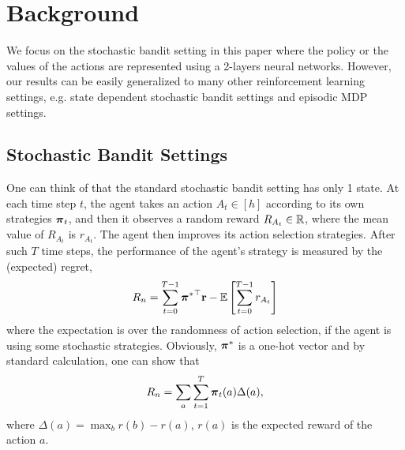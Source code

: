 \section{Background}
\label{sec:background}

We focus on the stochastic bandit setting in this paper where the policy or the values of the actions are represented using a 2-layers neural networks.  
However, our results can be easily generalized to many other reinforcement learning settings, e.g. state dependent stochastic bandit settings and episodic MDP settings.

\subsection{Stochastic Bandit Settings}
\label{subsec:settings}

One can think of that the standard stochastic bandit setting has only 1 state.  
At each time step $t$, the agent takes an action $A_t \in [h]$ according to its own strategies ${\boldsymbol{\pi}}_t$, and then it observes a random reward $R_{A_t} \in {\mathbb{R}}$, where the mean value of $R_{A_t}$ is $r_{A_t}$. 
The agent then improves its action selection strategies. 
After such $T$ time steps, the performance of the agent's strategy is measured by the (expected) regret,
\begin{equation}
\label{eq:expected_regret}
R_n = \sum\limits_{t=0}^{T-1}{{{\boldsymbol{\pi}}^*}^\top {\mathbf{r}}} - {\mathbb{E}} \left[ \sum\limits_{t=0}^{T-1}{  r_{ A_t}  } \right] 
\end{equation}
where the expectation is over the randomness of action selection, if the agent is using some stochastic strategies.
Obviously, ${\boldsymbol{\pi}}^*$ is a one-hot vector and by standard calculation, one can show that
\[
R_n = \sum_a \sum_{t=1}^T {\boldsymbol{\pi}}_t(a) \Delta(a),
\]
where $\Delta(a) = \max_b r(b)- r(a)$, $r(a)$ is the expected reward of the action $a$.



